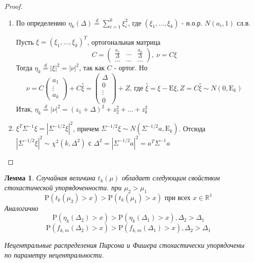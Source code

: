 \documentclass[12pt]{article}
\newtheorem{lemma}{Лемма}
\theoremstyle{basic_theorem}
\theoremstyle{name_theorem}
\def\R{ \mathbb{R} }
\def\E{ \mathrm{E} }
\def\P{ \mathrm{P} }
\begin{document}
\begin{proof}
    \begin{enumerate}
        \item По определению \(\eta_k(\Delta)\overset{d}{=}\sum_{i=1}^k\xi^2_i\),
        где \((\xi_1,\ldots,\xi_k)\) - н.о.р. \(N(a_i,1)\) сл.в.

        Пусть \(\xi=(\xi_1,\ldots, \xi_k)^T\), ортогональная матрица
        \[C=\begin{pmatrix}
            \frac{a_1}{\Delta}& \ldots& \frac{a_k}{\Delta} \\
            \ldots & \ldots &\ldots
        \end{pmatrix},\ \nu=C\xi\]
        Тогда \(\eta_k\overset{d}{=}\left\lvert \xi \right\rvert ^2=\left\lvert \nu \right\rvert ^2\), так как \(C\) - ортог.
        Но 
        \[\nu=C\begin{pmatrix}
            a_1 \\
            \vdots \\
            a_k
        \end{pmatrix} + C\overset{\circ}{\xi}=\begin{pmatrix}
            \Delta \\
            0 \\
            \vdots \\
            0
        \end{pmatrix} + Z \mbox{, где \(\overset{\circ}{\xi}=\xi-\E\xi, Z=C\overset{\circ}{\xi}\sim N(0, \E_k)\)}\]
        Итак, \(\eta_k\overset{d}{=}\left\lvert \nu \right\rvert ^2=(z_1+\Delta)^2+z_2^2+\ldots+z_k^2\)

        \item \(\xi^T\Sigma^{-1}\xi=\left\lvert \Sigma^{-1/2}\xi \right\rvert ^2\), причем \(\Sigma^{-1/2}\xi\sim N(\Sigma^{-1/2}a, \E_k)\).
        Отсюда \(\left\lvert \Sigma^{-1/2}\xi \right\rvert ^2\sim\chi^2(k,\Delta^2)\) с \(\Delta^2=\left\lvert \Sigma^{-1/2}a \right\rvert ^2=a^T\Sigma^{-1}a\)
    \end{enumerate}
\end{proof}
    \begin{lemma}
        Случайная величина \(t_k(\mu)\) обладает следующим свойством стохастической упорядоченности.
        при \(\mu_2>\mu_1\)
        \begin{equation}\label{iid::st}
            \P\left(t_k(\mu_2)>x\right) > \P\left(t_k(\mu_1)>x\right)\mbox{ при всех \(x\in\R^1\)}
        \end{equation}
        Аналогично
        \begin{equation}\label{iid::xi}
            \P(\eta_k(\Delta_2)>x) > \P(\eta_k(\Delta_1)>x), \Delta_2>\Delta_1
        \end{equation}
        \begin{equation}\label{iid::fi}
            \P(f_{k,m}(\Delta_2)>x) > \P(f_{k,m}(\Delta_1)>x), \Delta_2>\Delta_1
        \end{equation}
    \begin{leftbar}
        Нецентральные распределения Пирсона и Фишера стохастически упорядочены
        по параметру нецентральности.
    \end{leftbar}
    \end{lemma}
\end{document}
